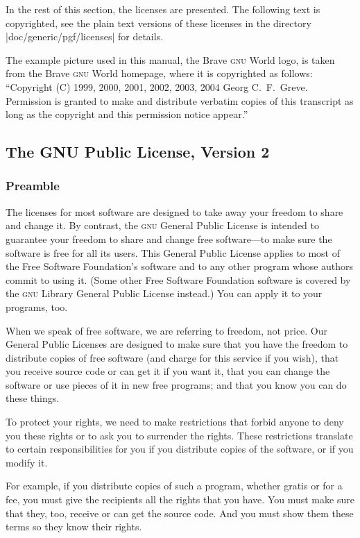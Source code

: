 In the rest of this section, the licenses are presented. The following text is
copyrighted, see the plain text versions of these licenses in the directory
|doc/generic/pgf/licenses| for details.

The example picture used in this manual, the Brave \textsc{gnu} World logo, is
taken from the Brave \textsc{gnu} World homepage, where it is copyrighted as
follows: ``Copyright (C) 1999, 2000, 2001, 2002, 2003, 2004 Georg C.~F.\ Greve.
Permission is granted to make and distribute verbatim copies of this transcript
as long as the copyright and this permission notice appear.''


\subsection{The GNU Public License, Version 2}

\subsubsection{Preamble}

The licenses for most software are designed to take away your freedom to share
and change it.  By contrast, the \textsc{gnu} General Public License is
intended to guarantee your freedom to share and change free software---to make
sure the software is free for all its users.  This General Public License
applies to most of the Free Software Foundation's software and to any other
program whose authors commit to using it.  (Some other Free Software Foundation
software is covered by the \textsc{gnu} Library General Public License
instead.)  You can apply it to your programs, too.

When we speak of free software, we are referring to freedom, not price. Our
General Public Licenses are designed to make sure that you have the freedom to
distribute copies of free software (and charge for this service if you wish),
that you receive source code or can get it if you want it, that you can change
the software or use pieces of it in new free programs; and that you know you
can do these things.

To protect your rights, we need to make restrictions that forbid anyone to deny
you these rights or to ask you to surrender the rights.  These restrictions
translate to certain responsibilities for you if you distribute copies of the
software, or if you modify it.

For example, if you distribute copies of such a program, whether gratis or for
a fee, you must give the recipients all the rights that you have.  You must
make sure that they, too, receive or can get the source code.  And you must
show them these terms so they know their rights.

